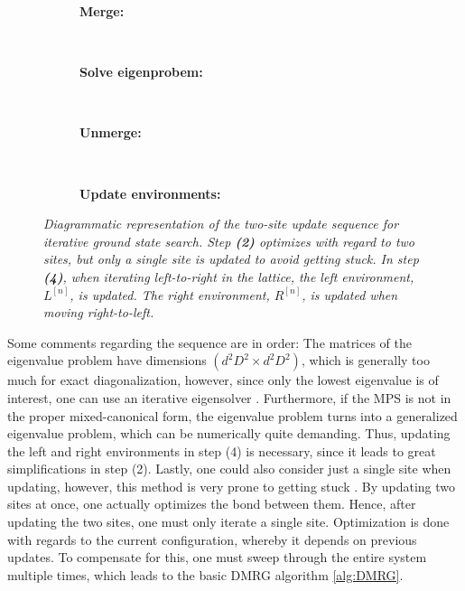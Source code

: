 \renewcommand{\thesubfigure}{\arabic{subfigure}}
\begin{figure}[h!]
	\centering
	\begin{subfigure}{\textwidth}
		\centering
		\caption{\textbf{Merge:}}
		
	\end{subfigure}\\[.25cm]
	
	\begin{subfigure}{\textwidth}
		\centering
		\caption{\textbf{Solve eigenprobem:}}
		
	\end{subfigure}\\[.25cm]

	\begin{subfigure}{\textwidth}
		\centering
		\caption{\textbf{Unmerge:}}
		
	\end{subfigure}\\[.25cm]

	\begin{subfigure}{\textwidth}
		\centering
		\caption{\textbf{Update environments:}}
		
	\end{subfigure}
	
	
	\caption{\textit{Diagrammatic representation of the two-site update sequence for iterative ground state search. Step \textbf{(2)} optimizes with regard to two sites, but only a single site is updated to avoid getting stuck. In step \textbf{(4)}, when iterating left-to-right in the lattice, the left environment, $L^{[n]}$, is updated. The right environment, $R^{[n]}$, is updated when moving right-to-left.}}
	\label{fig:twoSiteUpdate}
\end{figure}

Some comments regarding the sequence are in order: The matrices of the eigenvalue problem have dimensions $( d^2 D^2 \times d^2 D^2)$, which is generally too much for exact diagonalization, however, since only the lowest eigenvalue is of interest, one can use an iterative eigensolver \cite{Lanczos}. Furthermore, if the MPS is not in the proper mixed-canonical form, the eigenvalue problem turns into a generalized eigenvalue problem, which can be numerically quite demanding. Thus, updating the left and right environments in step (4) is necessary, since it leads to great simplifications in step (2). Lastly, one could also consider just a single site when updating, however, this method is very prone to getting stuck \cite{White2005}. By updating two sites at once, one actually optimizes the bond between them. Hence, after updating the two sites, one must only iterate a single site. Optimization is done with regards to the current configuration, whereby it depends on previous updates. To compensate for this, one must sweep through the entire system multiple times, which leads to the basic DMRG algorithm \ref{alg:DMRG}.

